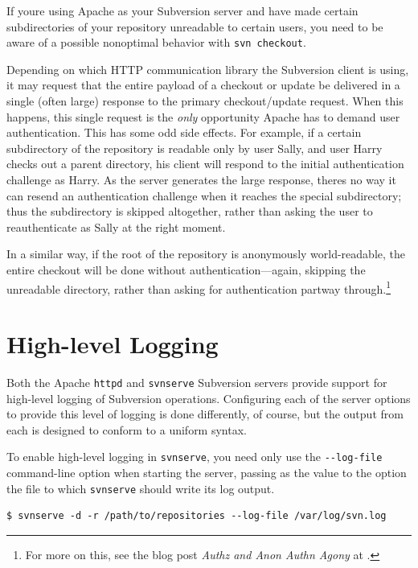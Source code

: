 If you\textquotesingle re using Apache as your Subversion server and
have made certain subdirectories of your repository unreadable to
certain users, you need to be aware of a possible nonoptimal behavior
with \texttt{svn\ checkout}.

Depending on which HTTP communication library the Subversion client is
using, it may request that the entire payload of a checkout or update be
delivered in a single (often large) response to the primary
checkout/update request. When this happens, this single request is the
\emph{only} opportunity Apache has to demand user authentication. This
has some odd side effects. For example, if a certain subdirectory of the
repository is readable only by user Sally, and user Harry checks out a
parent directory, his client will respond to the initial authentication
challenge as Harry. As the server generates the large response,
there\textquotesingle s no way it can resend an authentication challenge
when it reaches the special subdirectory; thus the subdirectory is
skipped altogether, rather than asking the user to reauthenticate as
Sally at the right moment.

In a similar way, if the root of the repository is anonymously
world-readable, the entire checkout will be done without
authentication---again, skipping the unreadable directory, rather than
asking for authentication partway through.\footnote{For more on this,
  see the blog post \emph{Authz and Anon Authn Agony} at
  \href{https://subversion.apache.org/blog/2007-03-27-authz-and-anon-authn-agony.html}{}.}

\section{High-level Logging}\label{svn.serverconfig.operational-logging}

Both the Apache \texttt{httpd} and \texttt{svnserve} Subversion servers
provide support for high-level logging of Subversion operations.
Configuring each of the server options to provide this level of logging
is done differently, of course, but the output from each is designed to
conform to a uniform syntax.

To enable high-level logging in \texttt{svnserve}, you need only use the
\texttt{-\/-log-file} command-line option when starting the server,
passing as the value to the option the file to which \texttt{svnserve}
should write its log output.

\begin{verbatim}
$ svnserve -d -r /path/to/repositories --log-file /var/log/svn.log
\end{verbatim}

